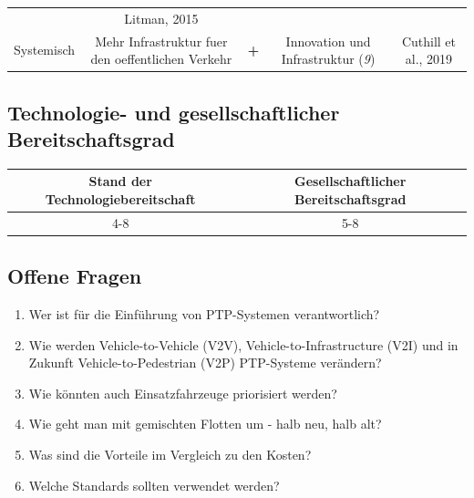 \documentclass[
]{book}
\providecommand{\tightlist}{%
  \setlength{\itemsep}{0pt}\setlength{\parskip}{0pt}}
\begin{document}
\begin{longtable}[]{@{}ccccc@{}}
\begin{minipage}[t]{0.17\columnwidth}
\end{minipage} & \begin{minipage}[t]{0.17\columnwidth}\centering
Litman, 2015\strut
\end{minipage}\tabularnewline
\begin{minipage}[t]{0.17\columnwidth}\centering
Systemisch\strut
\end{minipage} & \begin{minipage}[t]{0.16\columnwidth}\centering
Mehr Infrastruktur fuer den oeffentlichen Verkehr\strut
\end{minipage} & \begin{minipage}[t]{0.17\columnwidth}\centering
\textbf{+}\strut
\end{minipage} & \begin{minipage}[t]{0.17\columnwidth}\centering
Innovation und Infrastruktur (\emph{9})\strut
\end{minipage} & \begin{minipage}[t]{0.17\columnwidth}\centering
Cuthill et al., 2019\strut
\end{minipage}\tabularnewline
\bottomrule
\end{longtable}

\hypertarget{technologie--und-gesellschaftlicher-bereitschaftsgrad-3}{%
\subsection*{Technologie- und gesellschaftlicher Bereitschaftsgrad}\label{technologie--und-gesellschaftlicher-bereitschaftsgrad-3}}

\begin{longtable}[]{@{}cc@{}}
\toprule
Stand der Technologiebereitschaft & Gesellschaftlicher Bereitschaftsgrad\tabularnewline
\midrule
\endhead
4-8 & 5-8\tabularnewline
\bottomrule
\end{longtable}

\hypertarget{offene-fragen-5}{%
\subsection*{Offene Fragen}\label{offene-fragen-5}}

\begin{enumerate}
\def\labelenumi{\arabic{enumi}.}
\tightlist
\item
  Wer ist für die Einführung von PTP-Systemen verantwortlich?
\item
  Wie werden Vehicle-to-Vehicle (V2V), Vehicle-to-Infrastructure (V2I) und in Zukunft Vehicle-to-Pedestrian (V2P) PTP-Systeme verändern?
\item
  Wie könnten auch Einsatzfahrzeuge priorisiert werden?
\item
  Wie geht man mit gemischten Flotten um - halb neu, halb alt?
\item
  Was sind die Vorteile im Vergleich zu den Kosten?
\item
  Welche Standards sollten verwendet werden?
\end{enumerate}
\end{document}
